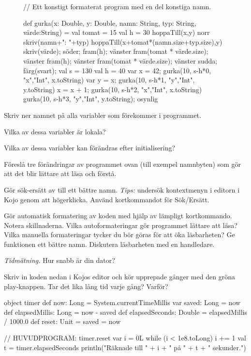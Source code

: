\begin{figure}
\begin{Code}
// Ett konstigt formaterat program med en del konstiga namn.

def gurka(x: Double,
y: Double, namn: String,
typ: String,
värde:String) = {
val tomat = 15
val h = 30
hoppaTill(x,y)
norr
skriv(namn+": "+typ)
hoppaTill(x+tomat*(namn.size+typ.size),y)
skriv(värde); söder; fram(h); vänster
fram(tomat * värde.size); vänster
fram(h); vänster
fram(tomat * värde.size); vänster }
sudda; färg(svart); val s = 130
val h = 40
var x = 42; gurka(10, s-h*0, "x","Int", x.toString)
var y = x; gurka(10, s-h*1, "y","Int", y.toString)
x = x + 1; gurka(10, s-h*2, "x","Int", x.toString)
gurka(10, s-h*3, "y","Int", y.toString); osynlig
\end{Code}
\end{figure}

\Subtask\Pen Skriv ner namnet på alla variabler som förekommer i programmet.

\Subtask\Pen Vilka av dessa variabler är lokala?

\Subtask\Pen Vilka av dessa variabler kan förändras efter initialisering?

\Subtask\Pen Föreslå tre förändringar av programmet ovan (till exempel namnbyten) som gör att det blir lättare att läsa och förstå.

\Subtask Gör sök-ersätt av  till ett bättre namn. \emph{Tips:} undersök kontextmenyn i editorn i Kojo genom att högerklicka. Använd kortkommandot för Sök/Ersätt.

\Subtask Gör automatisk formatering av koden med hjälp av lämpligt kortkommando. Notera skillnaderna. Vilka autoformateringar gör programmet lättare att läsa? Vilka manuella formateringar tycker du bör göras för att öka läsbarheten? Ge funktionen  ett bättre namn.  Diskutera läsbarheten med en handledare.



\Task \label{task:measuretime} \emph{Tidmätning.} Hur snabb är din dator?

\Subtask \label{task:timer} Skriv in koden nedan i Kojos editor och kör upprepade gånger med den gröna play-knappen. Tar det lika lång tid varje gång? Varför?

\begin{Code}
object timer {
  def now: Long = System.currentTimeMillis
  var saved: Long = now
  def elapsedMillis: Long = now - saved
  def elapsedSeconds: Double = elapsedMillis / 1000.0
  def reset: Unit = { saved = now }
}

// HUVUDPROGRAM:
timer.reset
var i = 0L
while (i < 1e8.toLong) { i += 1 }
val t = timer.elapsedSeconds
println("Räknade till " + i + " på " + t + " sekunder.")
\end{Code}


